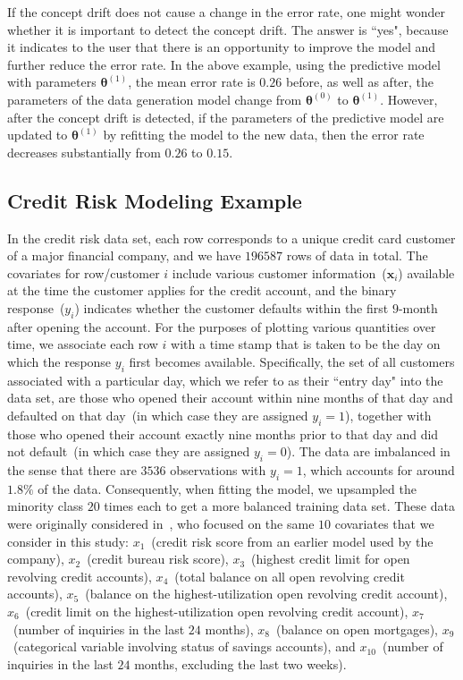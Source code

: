 \documentclass[twoside,11pt]{article}
\begin{document}
If the concept drift does not cause a change in the error rate, one might wonder whether it is important to detect the concept drift. The answer is ``yes", because it indicates to the user that there is an opportunity to improve the model and further reduce the error rate. In the above example, using the predictive model with parameters $\bm{\theta}^{(1)}$, the mean error rate is $0.26$ before, as well as after, the parameters of the data generation model change from $\bm{\theta}^{(0)}$ to $\bm{\theta}^{(1)}$. However, after the concept drift is detected, if the parameters of the predictive model are updated to $\bm{\theta}^{(1)}$ by refitting the model to the new data, then the error rate decreases substantially from $0.26$ to $0.15$. 


\subsection{Credit Risk Modeling Example}
\label{ss:cr_ds}
In the credit risk data set, each row corresponds to a unique credit card customer of a major financial company, and we have $196587$ rows of data in total. The covariates for row/customer $i$ include various customer information~($\bm {x}_i$) available at the time the customer applies for the credit account, and the binary response~($y_i$) indicates whether the customer defaults within the first $9$-month after opening the account. For the purposes of plotting various quantities over time, we associate each row $i$ with a time stamp that is taken to be the day on which the response $y_i$ first becomes available. Specifically, the set of all customers associated with a particular day, which we refer to as their ``entry day" into the data set, are those who opened their account within nine months of that day and defaulted on that day~(in which case they are assigned $y_i=1$), together with those who opened their account exactly nine months prior to that day and did not default~(in which case they are assigned $y_i=0$). The data are imbalanced in the sense that there are $3536$ observations with $y_i = 1$, which accounts for around $1.8\%$ of the data. Consequently, when fitting the model, we upsampled the minority class $20$ times each to get a more balanced training data set. These data were originally considered in~\cite{im2012time}, who focused on the same $10$ covariates that we consider in this study: $x_1$~(credit risk score from an earlier model used by the company), $x_2$~(credit bureau risk score), $x_3$~(highest credit limit for open revolving credit accounts), $x_4$~(total balance on all open revolving credit accounts), $x_5$~(balance on the highest-utilization open revolving credit account), $x_6$~(credit limit on the highest-utilization open revolving credit account), $x_7$~(number of inquiries in the last $24$ months), $x_8$~(balance on open mortgages), $x_9$~(categorical variable involving status of savings accounts), and $x_{10}$~(number of inquiries in the last $24$ months, excluding the last two weeks). 
\end{document}
